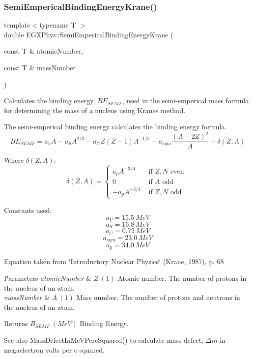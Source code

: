 \subsubsection{\texorpdfstring{Semi\+Emperical\+Binding\+Energy\+Krane()}{SemiEmpericalBindingEnergyKrane()}}
{\footnotesize\ttfamily template$<$typename T $>$ \\
double E\+G\+X\+Phys\+::\+Semi\+Emperical\+Binding\+Energy\+Krane (\begin{DoxyParamCaption}\item[{const T \&}]{atomic\+Number,  }\item[{const T \&}]{mass\+Number }\end{DoxyParamCaption})}



Calculates the binding energy, $BE_{SEMF}$, used in the semi-\/emperical mass formula for determining the mass of a nucleus using Krane\textquotesingle{}s method. 

The semi-\/emperical binding energy calculates the binding energy formula. \[BE_{SEMF} = a_V A - a_S A^{2/3}-a_C Z(Z-1)A^{-1/3}-a_{sym}\frac{(A-2Z)^2}{A}+\delta(Z,A)\]

Where $\delta(Z,A)$\+: \[\delta(Z,A)=\begin{cases} a_pA^{-3/4} & \text{ if } Z,N\text{ even }\\ 0 & \text{ if } A \text{ odd }\\ -a_pA^{-3/4} & \text{ if } Z,N \text{ odd } \end{cases}\]

Constants used\+: \[a_V = 15.5\ MeV\] \[a_S = 16.8\ MeV\] \[a_C = 0.72\ MeV\] \[a_{sym} = 23.0\ MeV\] \[a_p = 34.0\ MeV\]

Equation taken from \char`\"{}\+Introductory Nuclear Physics\char`\"{} (Krane, 1987), p. 68


\begin{DoxyParams}{Parameters}
{\em atomic\+Number} & $Z\ (1)$ Atomic number. The number of protons in the nucleus of an atom. \\
\hline
{\em mass\+Number} & $A\ (1)$ Mass number. The number of protons and neutrons in the nucleus of an atom. \\
\hline
\end{DoxyParams}
\begin{DoxyReturn}{Returns}
$B_{SEMF}\ (MeV)$ Binding Energy. 
\end{DoxyReturn}
\begin{DoxySeeAlso}{See also}
Mass\+Defect\+In\+Me\+V\+Perc\+Squared() to calculate mass defect, $\Delta m$ in megaelectron volts per c squared. 
\end{DoxySeeAlso}
